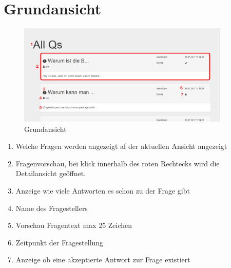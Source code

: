 \documentclass[a4paper]{report}
\begin{document}
\section{Grundansicht}
\begin{figure}[h!]
	\centering
	\includegraphics[width=0.9\textwidth]{AlleFragen.PNG}
	\caption{Grundansicht}
	\label{fig:Grundansicht}
\end{figure}
\centering\begin{enumerate}
	\item Welche Fragen werden angezeigt af der aktuellen Ansicht angezeigt
	\item Fragenvorschau, bei klick innerhalb des roten Rechtecks wird die Detailansicht geöffnet.
	\item Anzeige wie viele Antworten es schon zu der Frage gibt
	\item Name des Fragestellers
	\item Vorschau Fragentext max 25 Zeichen
	\item Zeitpunkt der Fragestellung
	\item Anzeige ob eine akzeptierte Antwort zur Frage existiert
\end{enumerate}
\newpage
\end{document}

